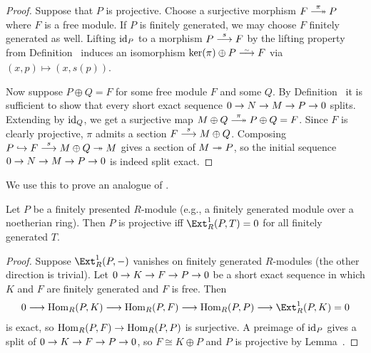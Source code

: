 \documentclass[a4paper,parskip=half,numbers=enddot, DIV=12]{scrreprt}
\begin{document}
\begin{proof}
	Suppose that $P$ is projective. Choose a surjective morphism $F\epimorphism[\pi]P$ where $F$ is a free module. If $P$ is finitely generated, we may choose $F$ finitely generated as well. Lifting $\operatorname{id}_P$ to a morphism $P\morphism[s]F$ by the lifting property from Definition~ induces an isomorphism $\ker(\pi)\oplus P\isomorphism F$ via $(x,p)\mapsto (x,s(p))$.
	
	Now suppose $P\oplus Q=F$ for some free module $F$ and some $Q$. By Definition~ it is sufficient to show that every short exact sequence $0\morphism N\morphism M\morphism P\morphism 0$ splits. Extending by $\operatorname{id}_Q$, we get a surjective map $M\oplus Q\epimorphism[\pi] P\oplus Q=F$. Since $F$ is clearly projective, $\pi$ admits a section $F\morphism[s]M\oplus Q$. Composing $P\monomorphism F\morphism[s]M\oplus Q\epimorphism M$ gives a section of $M\epimorphism P$, so the initial sequence $0\morphism N\morphism M\morphism P\morphism 0$ is indeed split exact.
\end{proof}
We use this to prove an analogue of .
\begin{cor}
	Let $P$ be a finitely presented $R$-module (e.g., a finitely generated module over a noetherian ring). Then $P$ is projective iff $\Ext_R^1(P,T)=0$ for all finitely generated $T$.
\end{cor}
\begin{proof}
	Suppose $\Ext_R^1(P,-)$ vanishes on finitely generated $R$-modules (the other direction is trivial). Let $0\morphism K\morphism F\morphism P\morphism 0$ be a short exact sequence in which $K$ and $F$ are finitely generated and $F$ is free. Then 
	\begin{align*}
		0\morphism\Hom_R(P,K)\morphism\Hom_R(P,F)\morphism\Hom_R(P,P)\morphism\Ext_R^1(P,K)=0
	\end{align*}
	is exact, so $\Hom_R(P,F)\morphism\Hom_R(P,P)$ is surjective. A preimage of $\operatorname{id}_P$ gives a split of $0\morphism K\morphism F\morphism P\morphism 0$, so $F\cong K\oplus P$ and $P$ is projective by Lemma~.
\end{proof}
\end{document}
